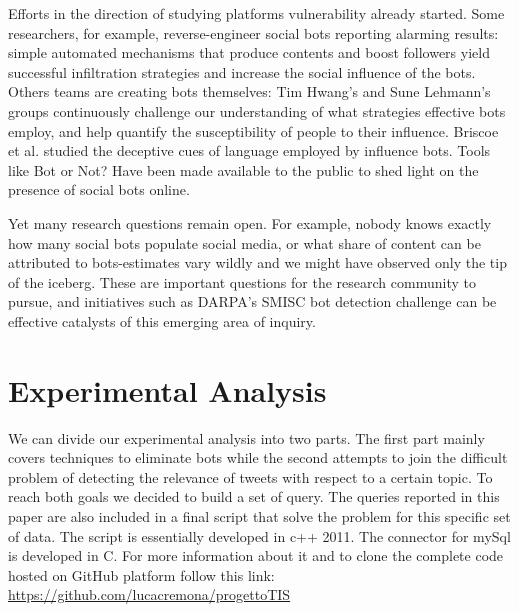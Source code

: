 \documentclass[conference, onecolumn]{IEEEtran}
\begin{document}
Efforts in the direction of studying platforms vulnerability already started. Some researchers, for example, reverse-engineer social bots reporting alarming results: simple automated mechanisms that produce contents and boost followers yield successful infiltration strategies and increase the social influence of the
bots. Others teams are creating bots themselves: Tim Hwang's and Sune Lehmann's groups continuously challenge our understanding of what strategies effective bots employ, and help quantify the susceptibility of people to their influence. Briscoe et al. studied the deceptive cues of language employed by influence bots. Tools like Bot or Not? Have been made available to the public to shed light on the presence of social bots online.
\medskip

Yet many research questions remain open. For example, nobody knows exactly how many social bots populate social media, or what share of content can be attributed to bots-estimates vary wildly and we might have observed only the tip of the iceberg. These are important questions for the research community to pursue, and initiatives such as DARPA's SMISC bot detection challenge can be effective catalysts of this emerging area of inquiry.

\section{Experimental Analysis}\label{sec:experimental analysis}
\medskip
We can divide our experimental analysis into two parts. The first part mainly covers techniques to eliminate bots while the second attempts to join the difficult problem of detecting the relevance of tweets with respect to a certain topic. To reach both goals we decided to build a set of query.
The queries reported in this paper are also included in a final script that solve the problem for this specific set of data. The script is essentially developed in c++ 2011. The connector for mySql is developed in C. For more information about it and to clone the complete code hosted on GitHub platform follow this link: \url{https://github.com/lucacremona/progettoTIS}
\end{document}
